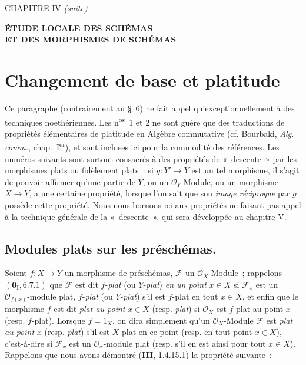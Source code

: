 \clearpage
\thispagestyle{plain}
\label{chapter:IV2-fr}

\begin{center}
{\large CHAPITRE IV \textit{(suite)}\par}
\vspace{1.5em}
{\Large\bfseries ÉTUDE LOCALE DES SCHÉMAS\\
ET DES MORPHISMES DE SCHÉMAS\par}
\end{center}

\setcounter{section}{1}
\section{Changement de base et platitude}
\label{section:IV.2-fr}

Ce paragraphe (contrairement au \S~6) ne fait appel qu'exceptionnellement à
des techniques noethériennes. Les n\textsuperscript{os}~1 et 2 ne sont guère
que des traductions de propriétés élémentaires de platitude en Algèbre
commutative (cf. Bourbaki, \emph{Alg. comm.}, chap.~I\textsuperscript{er}), et
sont incluses ici pour la commodité des références. Les numéros suivants sont
surtout consacrés à des propriétés de «~descente~» par les morphismes plats ou
fidèlement plats~: si $g:Y'\to Y$ est un tel morphisme, il s'agit de pouvoir
affirmer qu'une partie de $Y$, ou un $\mathcal O_Y$-Module, ou un morphisme
$X\to Y$, a une certaine propriété, lorsque l'on sait que son \emph{image
réciproque} par $g$ possède cette propriété. Nous nous bornons ici aux
propriétés ne faisant pas appel à la technique générale de la «~descente~»,
qui sera développée au chapitre V.

\setcounter{subsection}{0}
\subsection{Modules plats sur les préschémas.}
\label{subsection:IV.2.1-fr}

\begin{env}[2.1.1]
Soient $f:X\to Y$ un morphisme de préschémas, $\mathscr F$ un
$\mathcal O_X$-Module~; rappelons $(\mathbf{0}_{\mathrm I},6.7.1)$ que $\mathscr F$ est
dit $f$-\emph{plat} (ou $Y$-\emph{plat}) \emph{en un point} $x\in X$ si $\mathscr F_x$ est
un $\mathcal O_{f(x)}$-module plat, $f$-\emph{plat} (ou $Y$-\emph{plat}) s'il est $f$-plat
en tout $x\in X$, et enfin que le morphisme $f$ est dit \emph{plat au
point} $x\in X$ (resp. \emph{plat}) si $\mathcal O_X$ est $f$-plat au point $x$
(resp. $f$-plat). Lorsque $f=1_X$, on dira simplement qu'un
$\mathcal O_X$-Module $\mathscr F$ est \emph{plat au point} $x$ (resp. \emph{plat})
s'il est $X$-plat en ce point (resp. en tout point $x\in X$), c'est-à-dire si
$\mathscr F_x$ est un $\mathcal O_x$-module plat (resp. s'il en est ainsi pour
tout $x\in X$). Rappelons que nous avons démontré (\textbf{III}, 1.4.15.1) la propriété
suivante~:
\end{env}


